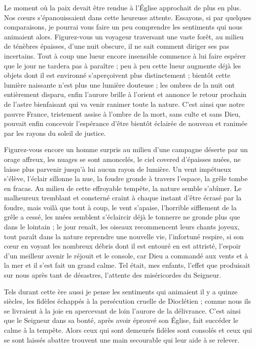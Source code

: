 \documentclass[11pt,a4paper]{report}
\begin{document}
Le moment où la paix devait être rendue à l'Église approchait de plus en plus.
Nos cœurs s'épanouissaient dans cette heureuse attente. Essayons, si par
quelques comparaisons, je pourrai vous faire un peu comprendre les sentiments
qui nous animaient alors. Figurez-vous un voyageur traversant une vaste forêt,
au milieu de ténèbres épaisses, d'une nuit obscure, il ne sait comment diriger
ses pas incertains. Tout à coup une lueur encore insensible commence à lui faire
espérer que le jour ne tardera pas à paraître ; peu à peu cette lueur augmente
déjà les objets dont il est environné s'aperçoivent plus distinctement ; bientôt
cette lumière naissante n'est plus une lumière douteuse ; les ombres de la nuit
ont entièrement disparu, enfin l'aurore brille à l'orient et annonce le retour
prochain de l'astre bienfaisant qui va venir ranimer toute la nature. C'est
ainsi que notre pauvre France, tristement assise à l'ombre de la mort, sans
culte et sans Dieu, pouvait enfin concevoir l'espérance d'être bientôt éclairée
de nouveau et ranimée par les rayons du soleil de justice.

Figurez-vous encore un homme surpris au milieu d'une campagne déserte par un
orage affreux, les nuages se sont amoncelés, le ciel covered d'épaisses nuées,
ne laisse plus parvenir jusqu'à lui aucun rayon de lumière. Un vent impétueux
s'élève, l'éclair sillonne la nue, la foudre gronde à travers l'espace, la grêle
tombe en fracas. Au milieu de cette effroyable tempête, la nature semble
s'abîmer. Le malheureux tremblant et consterné craint à chaque instant d'être
écrasé par la foudre, mais voilà que tout à coup, le vent s'apaise, l'horrible
sifflement de la grêle a cessé, les nuées semblent s'éclaircir déjà le tonnerre
ne gronde plus que dans le lointain ; le jour renaît, les oiseaux recommencent
leurs chants joyeux, tout paraît dans la nature reprendre une nouvelle vie,
l'infortuné respire, si son cœur en voyant les nombreux débris dont il est
entouré en est attristé, l'espoir d'un meilleur avenir le réjouit et le console,
car Dieu a commandé aux vents et à la mer et il s'est fait un grand calme. Tel
était, mes enfants, l'effet que produisait sur nous après tant de désastres,
l'attente des miséricordes du Seigneur.

Tels durant cette ère aussi je pense les sentiments qui animaient il y a quinze
siècles, les fidèles échappés à la persécution cruelle de Dioclétien ; comme
nous ils se livraient à la joie en apercevant de loin l'aurore de la délivrance.
C'est ainsi que le Seigneur dans sa bonté, après avoir éprouvé son Église, fait
succéder le calme à la tempête. Alors ceux qui sont demeurés fidèles sont
consolés et ceux qui se sont laissés abattre trouvent une main secourable qui
leur aide à se relever.
\end{document}
